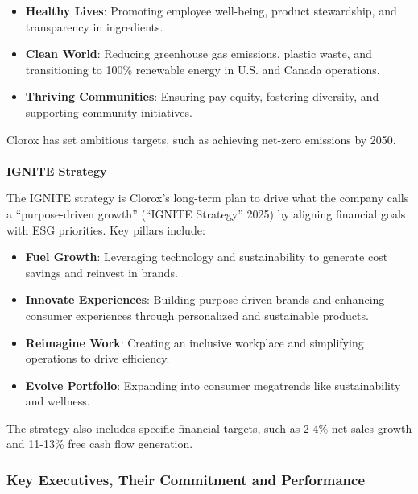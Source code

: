 \documentclass[
  letterpaper,
  DIV=11,
  numbers=noendperiod]{scrartcl}
\makeatletter
\let\oldparagraph\paragraph
\renewcommand{\paragraph}{
    \@ifstar
      \xxxParagraphStar
      \xxxParagraphNoStar
  }
\newcommand{\xxxParagraphStar}[1]{\oldparagraph*{#1}\mbox{}}
\newcommand{\xxxParagraphNoStar}[1]{\oldparagraph{#1}\mbox{}}
\providecommand{\tightlist}{%
  \setlength{\itemsep}{0pt}\setlength{\parskip}{0pt}}\usepackage{longtable,booktabs,array}
\makeatother
\begin{document}
\begin{itemize}
\tightlist
\item
  \textbf{Healthy Lives}: Promoting employee well-being, product
  stewardship, and transparency in ingredients.\\
\item
  \textbf{Clean World}: Reducing greenhouse gas emissions, plastic
  waste, and transitioning to 100\% renewable energy in U.S. and Canada
  operations.\\
\item
  \textbf{Thriving Communities}: Ensuring pay equity, fostering
  diversity, and supporting community initiatives.
\end{itemize}

Clorox has set ambitious targets, such as achieving net-zero emissions
by 2050.

\paragraph{\texorpdfstring{\textbf{IGNITE
Strategy}}{IGNITE Strategy}}\label{ignite-strategy}

The IGNITE strategy is Clorox's long-term plan to drive what the company
calls a ``purpose-driven growth'' ({``{IGNITE Strategy}''} 2025) by
aligning financial goals with ESG priorities. Key pillars include:

\begin{itemize}
\tightlist
\item
  \textbf{Fuel Growth}: Leveraging technology and sustainability to
  generate cost savings and reinvest in brands.\\
\item
  \textbf{Innovate Experiences}: Building purpose-driven brands and
  enhancing consumer experiences through personalized and sustainable
  products.\\
\item
  \textbf{Reimagine Work}: Creating an inclusive workplace and
  simplifying operations to drive efficiency.\\
\item
  \textbf{Evolve Portfolio}: Expanding into consumer megatrends like
  sustainability and wellness.
\end{itemize}

The strategy also includes specific financial targets, such as 2-4\% net
sales growth and 11-13\% free cash flow generation.

\subsubsection{\texorpdfstring{\textbf{Key Executives, Their Commitment
and
Performance}}{Key Executives, Their Commitment and Performance}}\label{key-executives-their-commitment-and-performance}
\end{document}
